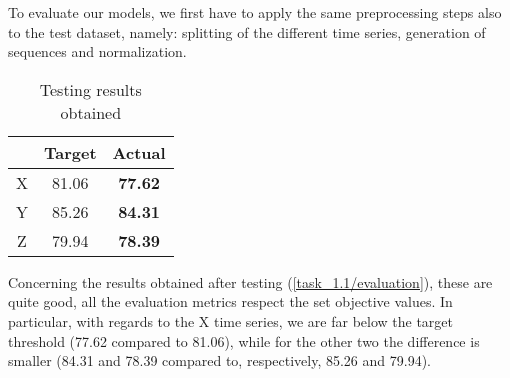 \documentclass[12pt,a4paper,leqno]{article}
\begin{document}
	To evaluate our models, we first have to apply the same preprocessing steps also to the test dataset, namely: splitting of the different time series, generation of sequences and normalization.
	\begin{table}
		\centering
		\begin{tabular}{|c|c|c|}
			\hline
			& \textbf{Target} & \textbf{Actual} \\ 
			\hline
			\hline
			X & 81.06 & \textbf{77.62} \\
			Y & 85.26 & \textbf{84.31} \\
			Z & 79.94 & \textbf{78.39} \\
			\hline
		\end{tabular}
		\caption{Testing results obtained}
		\label{task_1.1/evaluation}
	\end{table}
	Concerning the results obtained after testing (\autoref{task_1.1/evaluation}), these are quite good, all the evaluation metrics respect the set objective values. In particular, with regards to the X time series, we are far below the target threshold (77.62 compared to 81.06), while for the other two the difference is smaller (84.31 and 78.39 compared to, respectively, 85.26 and 79.94).	
	
\end{document}
